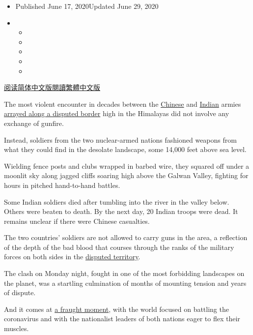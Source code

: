 \begin{itemize}
\item
  Published June 17, 2020Updated June 29, 2020
\item
  \begin{itemize}
  \item
  \item
  \item
  \item
  \item
  \end{itemize}
\end{itemize}

\href{https://cn.nytimes.com/world/20200618/india-china-border-clashes/}{阅读简体中文版}\href{https://cn.nytimes.com/world/20200618/india-china-border-clashes/zh-hant/}{閱讀繁體中文版}

The most violent encounter in decades between the
\href{https://www.nytimes.com/2020/06/29/world/asia/tik-tok-banned-india-china.html}{Chinese}
and
\href{https://www.nytimes.com/2020/06/29/world/asia/tik-tok-banned-india-china.html}{Indian}
armies
\href{https://www.nytimes.com/2020/06/16/world/asia/india-china-border.html}{arrayed
along a disputed border} high in the Himalayas did not involve any
exchange of gunfire.

Instead, soldiers from the two nuclear-armed nations fashioned weapons
from what they could find in the desolate landscape, some 14,000 feet
above sea level.

Wielding fence posts and clubs wrapped in barbed wire, they squared off
under a moonlit sky along jagged cliffs soaring high above the Galwan
Valley, fighting for hours in pitched hand-to-hand battles.

Some Indian soldiers died after tumbling into the river in the valley
below. Others were beaten to death. By the next day, 20 Indian troops
were dead. It remains unclear if there were Chinese casualties.

The two countries' soldiers are not allowed to carry guns in the area, a
reflection of the depth of the bad blood that courses through the ranks
of the military forces on both sides in the
\href{https://timesmachine.nytimes.com/timesmachine/1962/11/21/87047861.pdf?pdf_redirect=true\&ip=0}{disputed
territory}.

The clash on Monday night, fought in one of the most forbidding
landscapes on the planet, was a startling culmination of months of
mounting tension and years of dispute.

And it comes at
\href{https://www.nytimes.com/2020/06/17/world/asia/china-india-border.html}{a
fraught moment}, with the world focused on battling the coronavirus and
with the nationalist leaders of both nations eager to flex their
muscles.


